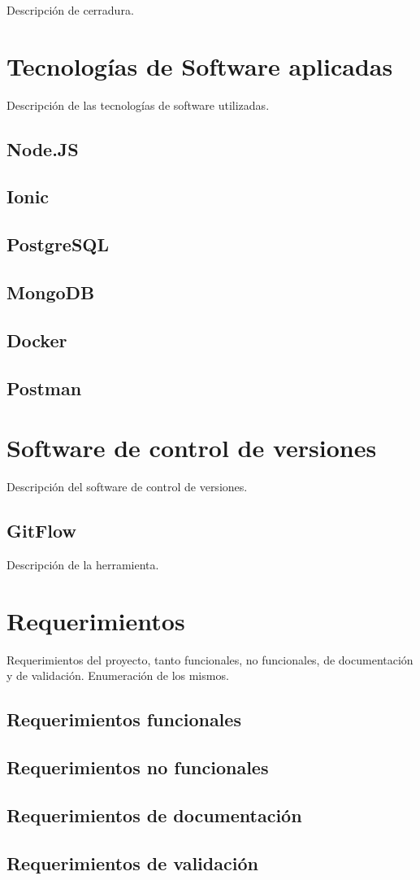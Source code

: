 Descripción de cerradura.

\section{Tecnologías de Software aplicadas}
 
Descripción de las tecnologías de software utilizadas.

\subsection{Node.JS}
\subsection{Ionic}
\subsection{PostgreSQL}
\subsection{MongoDB}
\subsection{Docker}
\subsection{Postman}


\section{Software de control de versiones}

Descripción del software de control de versiones.

\subsection{GitFlow}

Descripción de la herramienta.

\section{Requerimientos}
 
Requerimientos del proyecto, tanto funcionales, no funcionales, de documentación y de validación. Enumeración de los mismos.
 
\subsection{Requerimientos funcionales}
\subsection{Requerimientos no funcionales}
\subsection{Requerimientos de documentación}
\subsection{Requerimientos de validación}

